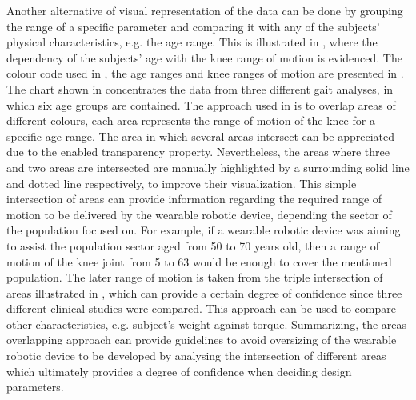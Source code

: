 Another alternative of visual representation of the data can be done by grouping the range of a specific parameter and comparing it with any of the subjects' physical characteristics, e.g. the age range. This is illustrated in , where the dependency of the subjects' age with the knee range of motion is evidenced. The colour code used in , the age ranges and knee ranges of motion are presented in . The chart shown in  concentrates the data from three different gait analyses, in which six age groups are contained. The approach used in  is to overlap areas of different colours, each area represents the range of motion of the knee for a specific age range. The area in which several areas intersect can be appreciated due to the enabled transparency property. Nevertheless, the areas where three and two areas are intersected are manually highlighted by a surrounding solid line and dotted line respectively, to improve their visualization. This simple intersection of areas can provide information regarding the required range of motion to be delivered by the wearable robotic device, depending the sector of the population focused on.
For example, if a wearable robotic device was aiming to assist the population sector aged from 50 to 70 years old, then a range of motion of the knee joint from 5 to 63 would be enough to cover the mentioned population. The later range of motion is taken from the triple intersection of areas illustrated in , which can provide a certain degree of confidence since three different clinical studies were compared. This approach can be used to compare other characteristics, e.g. subject's weight against torque. Summarizing, the areas overlapping approach can provide guidelines to avoid oversizing of the wearable robotic device to be developed by analysing the intersection of different areas which ultimately provides a degree of confidence when deciding design parameters.

